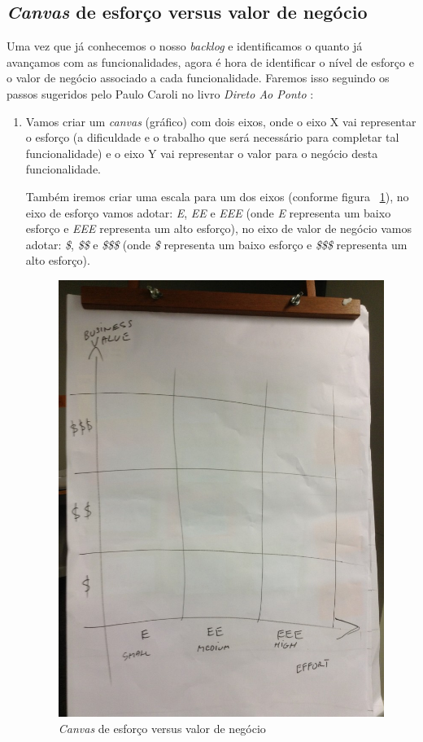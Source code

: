 \documentclass[10pt]{article}
\begin{document}
        \subsection{\textit{Canvas} de esforço versus valor de negócio}\label{sec:abordagem-como-valor-esforco}
            Uma vez que já conhecemos o nosso \textit{backlog} e identificamos o quanto já avançamos com as funcionalidades, agora é hora de identificar o nível de esforço e o valor de negócio associado a cada funcionalidade. Faremos isso seguindo os passos sugeridos pelo Paulo Caroli no livro \textit{Direto Ao Ponto} \cite{Caroli:DiretoAoPonto}:
            
            \begin{enumerate}
                \item Vamos criar um \textit{canvas} (gráfico) com dois eixos, onde o eixo X vai representar o esforço (a dificuldade e o trabalho que será necessário para completar tal funcionalidade) e o eixo Y vai representar o valor para o negócio desta funcionalidade.
                
                Também iremos criar uma escala para um dos eixos (conforme figura ~\ref{figura:5}), no eixo de esforço vamos adotar: \textit{E}, \textit{EE} e \textit{EEE} (onde \textit{E} representa um baixo esforço e \textit{EEE} representa um alto esforço), no eixo de valor de negócio vamos adotar: \textit{\$}, \textit{\$\$} e \textit{\$\$\$} (onde \textit{\$} representa um baixo esforço e \textit{\$\$\$} representa um alto esforço). 
                
                \begin{figure}[H]
            		\centering
            		\includegraphics[width=.4\textwidth]{images/canvas-esforco-valor.jpg}
            		\caption{\textit{Canvas} de esforço versus valor de negócio}
            		\label{figura:5}
            	\end{figure}
                

\end{enumerate}
\end{document}
